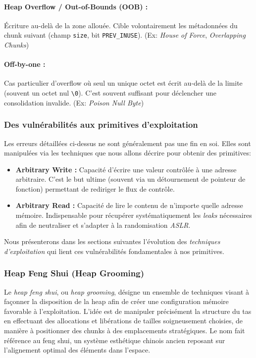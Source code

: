 \paragraph{Heap Overflow / Out-of-Bounds (OOB) :} Écriture au-delà de la zone allouée. Cible volontairement les métadonnées du chunk suivant (champ \texttt{size}, bit \texttt{PREV\_INUSE}). (Ex: \textit{House of Force}, \textit{Overlapping Chunks})

\paragraph{Off-by-one :} Cas particulier d'overflow où seul un unique octet est écrit au-delà de la limite (souvent un octet nul \verb|\0|). C'est souvent suffisant pour déclencher une consolidation invalide. (Ex: \textit{Poison Null Byte})

\subsubsection{Des vulnérabilités aux primitives d'exploitation}

Les erreurs détaillées ci-dessus ne sont généralement pas une fin en soi. Elles sont manipulées via les techniques que nous allons décrire pour obtenir des primitives:

\begin{itemize}
    \item \textbf{Arbitrary Write :} Capacité d'écrire une valeur contrôlée à une adresse arbitraire. C'est le but ultime (souvent via un détournement de pointeur de fonction) permettant de rediriger le flux de contrôle.
    \item \textbf{Arbitrary Read :} Capacité de lire le contenu de n'importe quelle adresse mémoire. Indispensable pour récupérer systématiquement les \textit{leaks} nécessaires afin de neutraliser et s'adapter à la randomisation \textit{ASLR}.
\end{itemize}

Nous présenterons dans les sections suivantes l'évolution des \textit{techniques d'exploitation} qui lient ces vulnérabilités fondamentales à nos primitives.

\subsubsection{Heap Feng Shui (Heap Grooming)}

Le \textit{heap feng shui}, ou \textit{heap grooming}, désigne un ensemble de techniques visant à façonner la disposition de la heap afin de créer une configuration mémoire favorable à l'exploitation.
L'idée est de manipuler précisément la structure du tas en effectuant des allocations et libérations de tailles soigneusement choisies, de manière à positionner des chunks à des emplacements stratégiques.
Le nom fait référence au feng shui, un système esthétique chinois ancien reposant sur l'alignement optimal des éléments dans l'espace.

